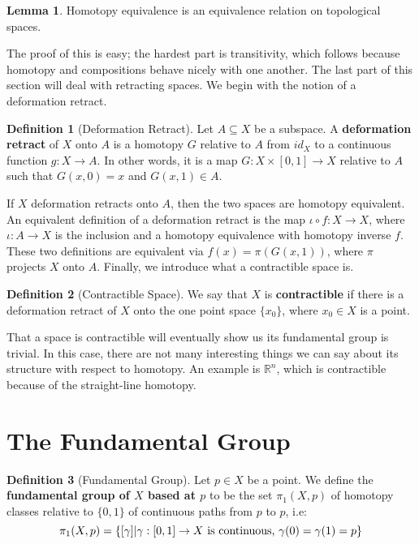 \documentclass[11pt, oneside]{amsart}   	%
\theoremstyle{definition}
\newtheorem{definition}{Definition}[section]
\newtheorem{lemma}[theorem]{Lemma}
\begin{document}
	\begin{lemma}
		Homotopy equivalence is an equivalence relation on topological spaces.
	\end{lemma}
	
	The proof of this is easy; the hardest part is transitivity, which follows because homotopy and compositions behave nicely with one another. The last part of 
	this section will deal with retracting spaces. We begin with the notion of a deformation retract.
	
	\begin{definition}[Deformation Retract]
		Let $A\subseteq X$ be a subspace. A \textbf{deformation retract} of $X$ onto $A$ is a homotopy $G$ relative to $A$ from $id_X$ to a continuous function 
		$g : X\rightarrow A$. In other words, it is a map $G : X\times [0, 1]\rightarrow X$ relative to $A$ such that $G(x, 0) = x$ and $G(x, 1)\in A$. 
	\end{definition}
	
	If $X$ deformation retracts onto $A$, then the two spaces are homotopy equivalent. An equivalent definition of a deformation retract is the map $\iota\circ f : 
	X\rightarrow X$, where $\iota : A\rightarrow X$ is the inclusion and a homotopy equivalence with homotopy inverse $f$. These two definitions are equivalent 
	via $f(x) = \pi(G(x, 1))$, where $\pi$ projects $X$ onto $A$. Finally, we introduce what a contractible space is.
	
	\begin{definition}[Contractible Space]
		We say that $X$ is \textbf{contractible} if there is a deformation retract of $X$ onto the one point space $\{x_0\}$, where $x_0\in X$ is a point. 
	\end{definition}
	
	That a space is contractible will eventually show us its fundamental group is trivial. In this case, there are not many interesting things we can say about its 
	structure with respect to homotopy. An example is $\mathbb R^n$, which is contractible because of the straight-line homotopy.

\section{The Fundamental Group}

	\begin{definition}[Fundamental Group]
		Let $p\in X$ be a point. We define the \textbf{fundamental group of $X$ based at $p$} to be the set $\pi_1(X, p)$ of homotopy classes relative to $\{0, 1\}$ 
		of continuous paths from $p$ to $p$, i.e:
		$$
			\pi_1(X, p) = \{[\gamma] | \gamma : [0, 1]\rightarrow X\textnormal{ is continuous, }\gamma(0) = \gamma(1) = p\}
		$$
	\end{definition}
	
\end{document}

